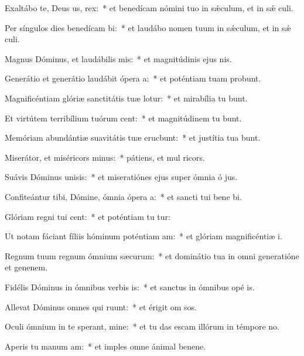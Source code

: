 \item Exaltábo te, Deus us, rex:~* et benedícam nómini tuo in sǽculum, et in sǽ culi.
\item Per síngulos dies benedícam bi:~* et laudábo nomen tuum in sǽculum, et in sǽ culi.
\item Magnus Dóminus, et laudábilis mis:~* et magnitúdinis ejus   nis.
\item Generátio et generátio laudábit ópera a:~* et poténtiam tuam probunt.
\item Magnificéntiam glóriæ sanctitátis tuæ lotur:~* et mirabília tu bunt.
\item Et virtútem terribílium tuórum cent:~* et magnitúdinem tu bunt.
\item Memóriam abundántiæ suavitátis tuæ erucbunt:~* et justítia tua bunt.
\item Miserátor, et miséricors minus:~* pátiens, et mul ricors.
\item Suávis Dóminus unisis:~* et miseratiónes ejus super ómnia ó jus.
\item Confiteántur tibi, Dómine, ómnia ópera a:~* et sancti tui bene bi.
\item Glóriam regni tui cent:~* et poténtiam tu tur:
\item Ut notam fáciant fíliis hóminum poténtiam am:~* et glóriam magnificéntiæ  i.
\item Regnum tuum regnum ómnium sæcurum:~* et dominátio tua in omni generatióne et genenem.
\item Fidélis Dóminus in ómnibus verbis is:~* et sanctus in ómnibus opé is.
\item Allevat Dóminus omnes qui ruunt:~* et érigit om sos.
\item Oculi ómnium in te sperant, mine:~* et tu das escam illórum in témpore no.
\item Aperis tu manum am:~* et imples omne ánimal benene.
